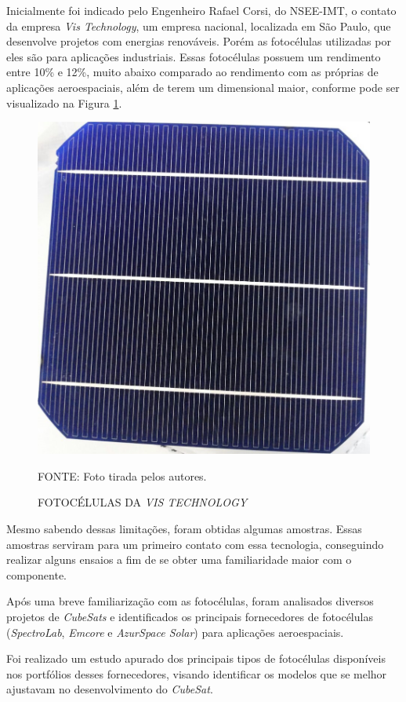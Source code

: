 \documentclass[
	12pt,				%
	openright,			%
	oneside,			%
	a4paper,			%
	english,			%
	french,				%
	spanish,			%
	brazil,				%
	oldfontcommands
	]{abntex2}
\begin{document}
	Inicialmente foi indicado pelo Engenheiro Rafael Corsi, do NSEE-IMT, o contato da empresa \textit{Vis Technology}, um empresa nacional, localizada em São Paulo, que desenvolve projetos com energias renováveis. Porém as fotocélulas utilizadas por eles são para aplicações industriais. Essas fotocélulas possuem um rendimento entre 10\% e 12\%, muito abaixo comparado ao rendimento com as próprias de aplicações aeroespaciais, além de terem um dimensional maior, conforme pode ser visualizado na Figura \ref{Fig_Cell_Vis}.
	
	\begin{figure}[th]
		\caption{FOTOCÉLULAS DA \textit{VIS TECHNOLOGY}}
		\label{Fig_Cell_Vis}
		\centering
		\includegraphics[width=0.6\linewidth]{./figs/cell_vis}
			
		\begin{small}
			FONTE: Foto tirada pelos autores.
		\end{small}		
	\end{figure}
	\pagebreak
	
	Mesmo sabendo dessas limitações, foram obtidas algumas amostras. Essas amostras serviram para um primeiro contato com essa tecnologia, conseguindo realizar alguns ensaios a fim de se obter uma familiaridade maior com o componente.
	
	Após uma breve familiarização com as fotocélulas, foram analisados diversos projetos de \textit{CubeSats} e identificados os principais fornecedores de fotocélulas (\textit{SpectroLab}, \textit{Emcore} e \textit{AzurSpace Solar}) para aplicações aeroespaciais.
	
	Foi realizado um estudo apurado dos principais tipos de fotocélulas disponíveis nos portfólios desses fornecedores, visando identificar os modelos que se melhor ajustavam no desenvolvimento do \textit{CubeSat}.
	
\end{document}
